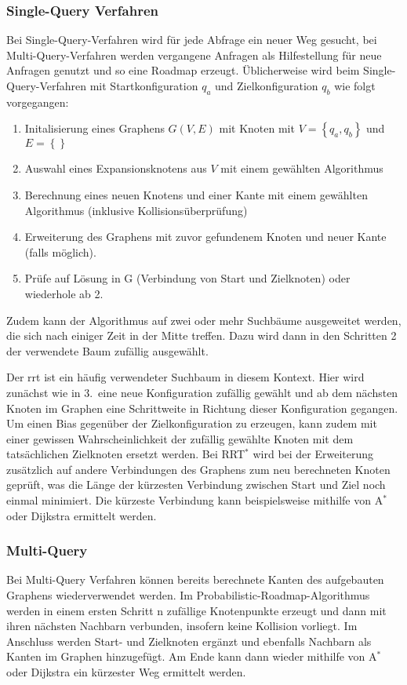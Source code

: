 \subsubsection{Single-Query Verfahren}

Bei Single-Query-Verfahren wird für jede Abfrage ein neuer Weg gesucht, bei Multi-Query-Verfahren werden vergangene Anfragen als Hilfestellung für neue Anfragen genutzt und so eine Roadmap erzeugt.
Üblicherweise wird beim Single-Query-Verfahren mit Startkonfiguration $q_a$ und Zielkonfiguration $q_b$ wie folgt vorgegangen:
\begin{enumerate}
    \item Initalisierung eines Graphens $G(V, E)$ mit Knoten mit $V=\left\{ q_a, q_b \right\}$ und $E=\left\{  \right\}$
    \item Auswahl eines Expansionsknotens aus $V$ mit einem gewählten Algorithmus
    \item Berechnung eines neuen Knotens und einer Kante mit einem gewählten Algorithmus (inklusive Kollisionsüberprüfung)
    \item Erweiterung des Graphens mit zuvor gefundenem Knoten und neuer Kante (falls möglich).
    \item Prüfe auf Lösung in G (Verbindung von Start und Zielknoten) oder wiederhole ab 2.
\end{enumerate}

Zudem kann der Algorithmus auf zwei oder mehr Suchbäume ausgeweitet werden, die sich nach einiger Zeit in der Mitte treffen.
Dazu wird dann in den Schritten 2 der verwendete Baum zufällig ausgewählt.

Der \ac{rrt} ist ein häufig verwendeter Suchbaum in diesem Kontext.
Hier wird zunächst wie in 3.\ eine neue Konfiguration zufällig gewählt und ab dem nächsten Knoten im Graphen eine Schrittweite in Richtung dieser Konfiguration gegangen.
Um einen Bias gegenüber der Zielkonfiguration zu erzeugen, kann zudem mit einer gewissen Wahrscheinlichkeit der zufällig gewählte Knoten mit dem tatsächlichen Zielknoten ersetzt werden.
Bei RRT$^*$ wird bei der Erweiterung zusätzlich auf andere Verbindungen des Graphens zum neu berechneten Knoten geprüft, was die Länge der kürzesten Verbindung zwischen Start und Ziel noch einmal minimiert.
Die kürzeste Verbindung kann beispielsweise mithilfe von A$^*$ oder Dijkstra ermittelt werden.

\subsubsection{Multi-Query}
Bei Multi-Query Verfahren können bereits berechnete Kanten des aufgebauten Graphens wiederverwendet werden.
Im Probabilistic-Roadmap-Algorithmus werden in einem ersten Schritt n zufällige Knotenpunkte erzeugt und dann mit ihren nächsten Nachbarn verbunden, insofern keine Kollision vorliegt.
Im Anschluss werden Start- und Zielknoten ergänzt und ebenfalls Nachbarn als Kanten im Graphen hinzugefügt.
Am Ende kann dann wieder mithilfe von A$^*$ oder Dijkstra ein kürzester Weg ermittelt werden.


